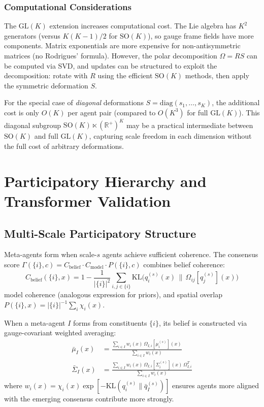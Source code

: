 \documentclass[11pt]{article}
\begin{document}
\subsubsection{Computational Considerations}

The $\mathrm{GL}(K)$ extension increases computational cost. The Lie algebra has $K^2$ generators (versus $K(K-1)/2$ for $\mathrm{SO}(K)$), so gauge frame fields have more components. Matrix exponentials are more expensive for non-antisymmetric matrices (no Rodrigues' formula). However, the polar decomposition $\Omega = RS$ can be computed via SVD, and updates can be structured to exploit the decomposition: rotate with $R$ using the efficient $\mathrm{SO}(K)$ methods, then apply the symmetric deformation $S$.

For the special case of \emph{diagonal} deformations $S = \mathrm{diag}(s_1, \ldots, s_K)$, the additional cost is only $O(K)$ per agent pair (compared to $O(K^3)$ for full $\mathrm{GL}(K)$). This diagonal subgroup $\mathrm{SO}(K) \ltimes (\mathbb{R}^+)^K$ may be a practical intermediate between $\mathrm{SO}(K)$ and full $\mathrm{GL}(K)$, capturing scale freedom in each dimension without the full cost of arbitrary deformations.

\section{Participatory Hierarchy and Transformer Validation}
\label{sec:hierarchy}

\subsection{Multi-Scale Participatory Structure}

Meta-agents form when scale-$s$ agents achieve sufficient coherence. The consensus score $\Gamma(\{i\}, c) = C_{\mathrm{belief}} \cdot C_{\mathrm{model}} \cdot P(\{i\}, c)$ combines belief coherence:
\begin{equation}
C_{\mathrm{belief}}(\{i\}, x) = 1 - \frac{1}{|\{i\}|^2}\sum_{i,j \in \{i\}} \mathrm{KL}\big(q_i^{(s)}(x) \,\|\, \Omega_{ij}[q_j^{(s)}](x)\big)
\end{equation}
model coherence (analogous expression for priors), and spatial overlap $P(\{i\}, x) = |\{i\}|^{-1}\sum_{i} \chi_i(x)$.

When a meta-agent $I$ forms from constituents $\{i\}$, its belief is constructed via gauge-covariant weighted averaging:
\begin{align}
\bar{\mu}_I(x) &= \frac{\sum_{i \in I} w_i(x) \, \Omega_{I,i}[\mu_i^{(s)}](x)}{\sum_{i \in I} w_i(x)} \\
\bar{\Sigma}_I(x) &= \frac{\sum_{i \in I} w_i(x) \, \Omega_{I,i}[\Sigma_i^{(s)}](x) \, \Omega_{I,i}^T}{\sum_{i \in I} w_i(x)}
\end{align}
where $w_i(x) = \chi_i(x) \exp[-\mathrm{KL}(q_i^{(s)} \| \bar{q}_I^{(s)})]$ ensures agents more aligned with the emerging consensus contribute more strongly.
\end{document}

